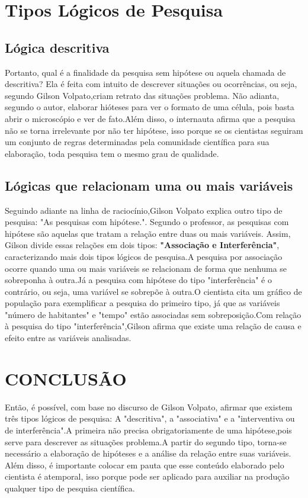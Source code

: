 \section{\esp Tipos Lógicos de Pesquisa}

\subsection{\esp Lógica descritiva}

Portanto, qual é a finalidade da pesquisa sem hipótese ou aquela chamada de descritiva? Ela é feita com intuito de descrever situações ou ocorrências, ou seja, 
segundo Gilson Volpato,criam retrato das situações problema. Não adianta, segundo o autor, elaborar hióteses para ver o formato de uma célula, pois basta abrir o microscópio e ver de fato.Além disso, o internauta afirma que a pesquisa não se torna irrelevante por não ter hipótese, isso porque se os cientistas seguiram um conjunto de regras determinadas pela comunidade científica para sua elaboração, toda pesquisa tem o mesmo grau de qualidade.


\subsection{\esp Lógicas que relacionam uma ou mais variáveis}

Seguindo adiante na linha de raciocínio,Gilson Volpato explica outro tipo de pesquisa: "As pesquisas com hipótese.". Segundo o professor, as pesquisas com hipótese são aquelas que tratam a relação entre duas ou mais variáveis. Assim, Gilson divide essas relações em dois tipos: \textbf{"Associação e Interferência"}, caracterizando mais dois tipos lógicos de pesquisa.A pesquisa por associação ocorre quando uma ou mais variáveis se relacionam de forma que nenhuma se sobreponha à outra.Já a pesquisa com hipótese do tipo "interferência" é o contrário, ou seja, uma variável se sobrepõe à outra.O cientista cita um gráfico de população para exemplificar a 
pesquisa do primeiro tipo, já que as variáveis "número de habitantes" e "tempo" estão associadas sem sobreposição.Com relação à pesquisa do tipo "interferência",Gilson
afirma que existe uma relação de causa e efeito entre as variáveis analisadas.

\section{\esp CONCLUSÃO}

Então, é possível, com base no discurso de Gilson Volpato, afirmar que existem três tipos lógicos de pesquisa: A "descritiva", a "associativa" e a "interventiva
ou de interferência".A primeira não precisa obrigatoriamente de uma hipótese,pois serve para descrever as situações problema.A partir do segundo tipo, torna-se necessário
a elaboração de hipóteses e a análise da relação entre suas variáveis. Além disso, é importante colocar em pauta que esse conteúdo elaborado pelo cientista é atemporal,
isso porque pode ser aplicado para auxiliar na produção qualquer tipo de pesquisa científica.


   



\
